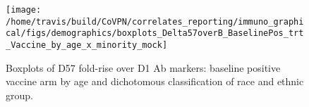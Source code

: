 \documentclass[]{book}
\theoremstyle{definition}
\theoremstyle{definition}
\theoremstyle{definition}
\newcommand{\1}{\mathbbm{1}}
\begin{document}
\clearpage
\begin{figure}[H]

{\centering \texttt{[image: /home/travis/build/CoVPN/correlates\_reporting/immuno\_graphical/figs/demographics/boxplots\_Delta57overB\_BaselinePos\_trt\_Vaccine\_by\_age\_x\_minority\_mock]} 

}

\caption{Boxplots of D57 fold-rise over D1 Ab markers: baseline positive vaccine arm by age and dichotomous classification of race and ethnic group.}\label{fig:unnamed-chunk-199}
\end{figure}


\end{document}
